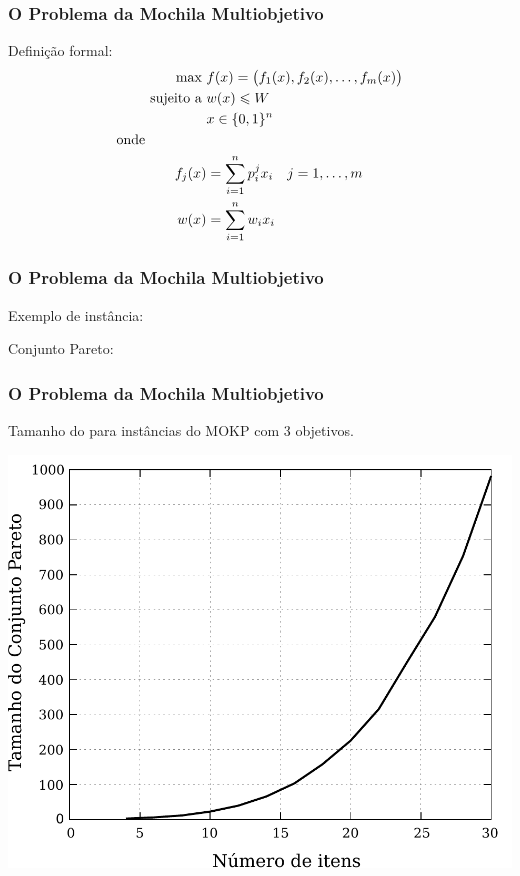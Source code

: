 \documentclass[10pt,xcolor=table,fleqn]{beamer}
\begin{document}
\begin{frame}
  \frametitle{O Problema da Mochila Multiobjetivo}
  \begin{block}{Definição formal:}
    \begin{align*}
      \text{max   } & f(x) =
        \big(f_1(x) ,f_2(x) ,\ldots ,f_{m}(x)\big) \\
      \text{sujeito a   } & w(x) \leqslant W \\
      & x \in \{0, 1\}^n\\
      \text{onde} \phantom{mmmmm} \\
      f_j(x) &= \sum_{i = 1}^n p^j_i x_i \quad j = 1, \ldots, m\\
      w(x) &= \sum_{i = 1}^n w_i x_i
    \end{align*}
  \end{block}
\end{frame}

\begin{frame}
	\frametitle{O Problema da Mochila Multiobjetivo}
  Exemplo de instância:
  \begin{table}[ht]
    
  \end{table}
  \pause
  Conjunto Pareto:
  \begin{table}[ht]
    
  \end{table}
\end{frame}

\begin{frame}
	\frametitle{O Problema da Mochila Multiobjetivo}
  Tamanho do \paretoset{} para instâncias do MOKP com 3 objetivos.
  \begin{center}
   	\includegraphics[scale=0.4]{../img/mokp/par-grow-d3}
  \end{center}
\end{frame}
\end{document}
